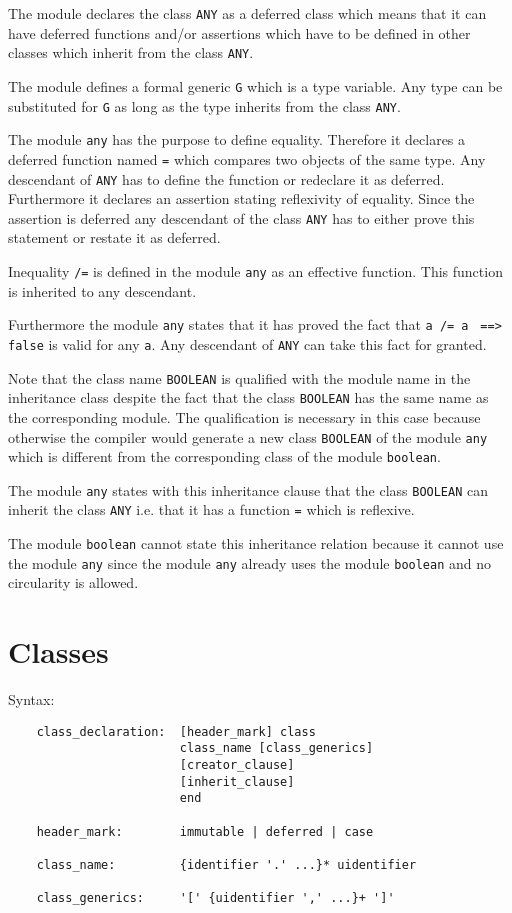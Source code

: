 The module declares the class \lstinline!ANY! as a deferred class which means
that it can have deferred functions and/or assertions which have to be defined
in other classes which inherit from the class \lstinline!ANY!.

The module defines a formal generic \lstinline!G! which is a type
variable. Any type can be substituted for \lstinline!G! as long as the type
inherits from the class \lstinline!ANY!.

The module \lstinline!any! has the purpose to define equality. Therefore it
declares a deferred function named \lstinline!=! which compares two objects of
the same type. Any descendant of \lstinline!ANY! has to define the function or
redeclare it as deferred. Furthermore it declares an assertion stating
reflexivity of equality. Since the assertion is deferred any descendant of the
class \lstinline!ANY!  has to either prove this statement or restate it as
deferred.

Inequality \lstinline!/=! is defined in the module \lstinline!any! as an
effective function. This function is inherited to any descendant.

Furthermore the module \lstinline!any! states that it has proved the fact that
\lstinline!a /= a! \lstinline! ==> false! is valid for any \lstinline!a!. Any
descendant of \lstinline!ANY! can take this fact for granted.

Note that the class name \lstinline!BOOLEAN! is qualified with the module name
in the inheritance class despite the fact that the class \lstinline!BOOLEAN!
has the same name as the corresponding module. The qualification is necessary
in this case because otherwise the compiler would generate a new class
\lstinline!BOOLEAN! of the module \lstinline!any! which is different from the
corresponding class of the module \lstinline!boolean!.

The module \lstinline!any! states with this inheritance clause that the class
\lstinline!BOOLEAN! can inherit the class \lstinline!ANY! i.e. that it has a
function \lstinline!=! which is reflexive.

The module \lstinline!boolean! cannot state this inheritance relation because
it cannot use the module \lstinline!any! since the module \lstinline!any!
already uses the module \lstinline!boolean!  and no circularity is allowed.



\section{Classes}
%
\noindent Syntax:
\begin{lstlisting}
    class_declaration:  [header_mark] class
                        class_name [class_generics]
                        [creator_clause]
                        [inherit_clause]
                        end

    header_mark:        immutable | deferred | case

    class_name:         {identifier '.' ...}* uidentifier

    class_generics:     '[' {uidentifier ',' ...}+ ']'
\end{lstlisting}



